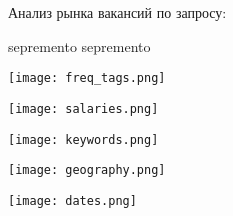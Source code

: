 \documentclass{article}
\newcommand*{\bodyfont}{\sourcesanspro}
\newcommand*{\headerstyle}[1]{\fontsize{16pt}{1em}\headerfont #1}
\newcommand*{\vacancystyle}[1]{{\fontsize{24pt}{1em}\bfseries\headerfont\color{awesome} #1}}
\newcommand*{\parstyle}[1]{\fontsize{9pt}{1em}\bodyfont #1}
\newcommand{\contSep}{\quad\textbar\quad}
\begin{document}
\pagestyle{fancy}
\headerstyle{Анализ рынка вакансий по запросу:}
\vspace{5pt}

\vacancystyle{\capitalisewords{\VacancyName}}

\parstyle{\faGithub\quad sepremento \contSep\faTelegram\quad sepremento}
\vspace{20pt}

\texttt{[image: freq\_tags.png]}
\vfill

\texttt{[image: salaries.png]}

\newpage
\vfill
\texttt{[image: keywords.png]}

\texttt{[image: geography.png]}
\vfill

\texttt{[image: dates.png]}
\end{document}
